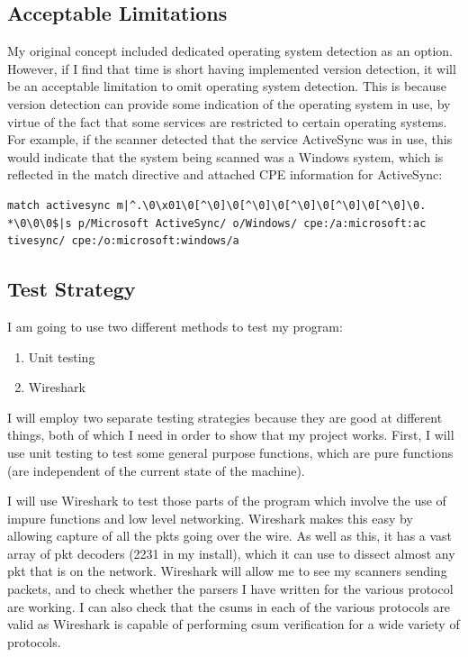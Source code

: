 \documentclass[titlepage]{article}
\let\Oldsubsection\subsection{}
\renewcommand{\subsection}{\FloatBarrier\Oldsubsection}
\begin{document}
\subsection{Acceptable Limitations}

My original concept included dedicated operating system detection as an option.
However, if I find that time is short having implemented version detection, it will
be an acceptable limitation to omit operating system detection.
This is because version detection can provide some indication of the operating system
in use, by virtue of the fact that some services are restricted to certain operating systems.
For example, if the scanner detected that the service ActiveSync was in use,
this would indicate that the system being scanned was a Windows system,
which is reflected in the match directive and attached CPE information for ActiveSync:
\begin{verbatim}
match activesync m|^.\0\x01\0[^\0]\0[^\0]\0[^\0]\0[^\0]\0[^\0]\0.
*\0\0\0$|s p/Microsoft ActiveSync/ o/Windows/ cpe:/a:microsoft:ac
tivesync/ cpe:/o:microsoft:windows/a
\end{verbatim}

\subsection{Test Strategy}

I am going to use two different methods to test my program:
\begin{enumerate}
\item{Unit testing}
\item{Wireshark}
\end{enumerate}
I will employ two separate testing strategies because they are good at different things,
both of which I need in order to show that my project works. First, I will use unit testing to test
some general purpose functions, which are pure functions (are independent of the current state
of the machine). 

I will use Wireshark to test those parts of the program which involve
the use of impure functions and low level networking.
Wireshark makes this easy by allowing capture of all the \glspl{pkt} going over the wire.
As well as this, it has a vast array of \gls{pkt} decoders (2231 in 
my install), which it can use to dissect almost any \gls{pkt} that is on the network.
Wireshark will allow me to see my scanners sending packets, and to check
whether the parsers I have written for the various protocol are working.
I can also check that the \glspl{csum} in each of the various protocols are valid
as Wireshark is capable of performing \gls{csum} verification for a wide variety of protocols. 
\end{document}
